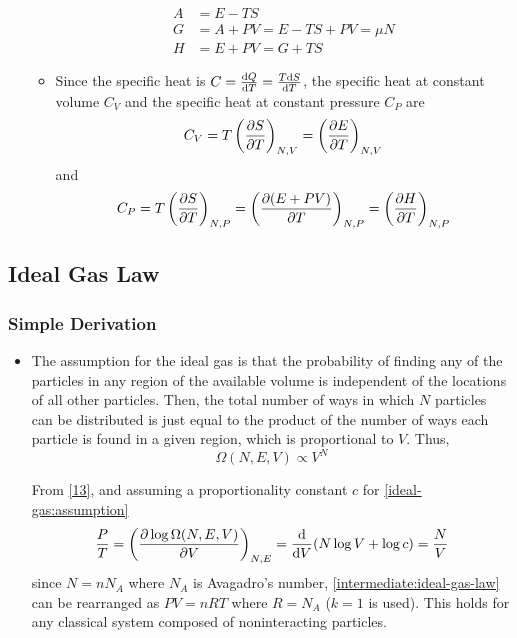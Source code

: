 \documentclass{article}
\begin{document}
\begin{itemize}
\begin{itemize}
\begin{align}
            A&=E-TS\\
            G&=A+PV=E-TS+PV=\mu N\\
            H&=E+PV=G+TS
        \end{align}
        \item Since the specific heat is $C=\derivative{Q}{T}=\frac{T\dd S}{\dd T}$, the specific heat at constant volume $C_V$ and the specific heat at constant pressure $C_P$ are
        \begin{equation}
            C_V=T\left(\partialderivative{S}{T}\right)_{N,V}=\left(\partialderivative{E}{T}\right)_{N,V}\label{cv}
        \end{equation}
        and
        \begin{equation}
            C_P=T\left(\partialderivative{S}{T}\right)_{N,P}=\left(\partialderivative{(E+PV)}{T}\right)_{N,P}=\left(\partialderivative{H}{T}\right)_{N,P}\label{cp}
        \end{equation}
    \end{itemize}
\end{itemize}
\subsection{Ideal Gas Law}
\subsubsection{Simple Derivation}
\begin{itemize}
    \item The assumption for the ideal gas is that the probability of finding any of the particles in any region of the available volume is independent of the locations of all other particles. Then, the total number of ways in which $N$ particles can be distributed is just equal to the product of the number of ways each particle is found in a given region, which is proportional to $V$. Thus,
    \begin{equation}
        \Omega(N,E,V)\propto V^N\label{ideal-gas:assumption}
    \end{equation}
    \begin{derivation}
        From \eqref{13}, and assuming a proportionality constant $c$ for \eqref{ideal-gas:assumption}
        \begin{equation}
            \frac{P}{T}=\left(\partialderivative{\log\Omega(N,E,V)}{V}\right)_{N,E}=\frac{\dd}{\dd V}(N\log V+\log c)=\frac{N}{V}\label{intermediate:ideal-gas-law}
        \end{equation}
        since $N=n N_A$ where $N_A$ is Avagadro's number, \eqref{intermediate:ideal-gas-law} can be rearranged as $PV=nRT$ where $R=N_A$ ($k=1$ is used). This holds for any classical system composed of noninteracting particles.
    \end{derivation}
\end{itemize}
\end{document}
